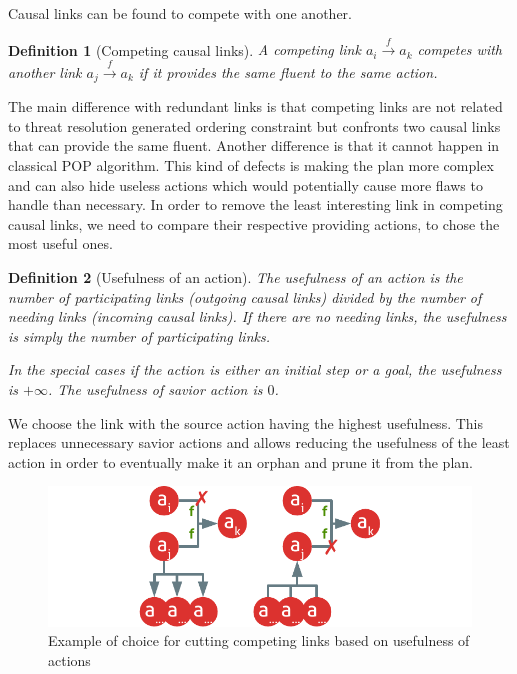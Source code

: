 \documentclass[]{article}
\newtheorem{definition}{Definition}
\begin{document}
Causal links can be found to compete with one another.

\begin{definition}[Competing causal links]

A competing link \(a_i \xrightarrow{f} a_k\) competes with another link
\(a_j \xrightarrow{f} a_k\) if it provides the same fluent to the same
action.

\end{definition}

The main difference with redundant links is that competing links are not
related to threat resolution generated ordering constraint but confronts
two causal links that can provide the same fluent. Another difference is
that it cannot happen in classical POP algorithm. This kind of defects
is making the plan more complex and can also hide useless actions which
would potentially cause more flaws to handle than necessary. In order to
remove the least interesting link in competing causal links, we need to
compare their respective providing actions, to chose the most useful
ones.

\begin{definition}[Usefulness of an action]

The usefulness of an action is the number of participating links
(outgoing causal links) divided by the number of needing links (incoming
causal links). If there are no needing links, the usefulness is simply
the number of participating links.

In the special cases if the action is either an initial step or a goal,
the usefulness is \(+\infty\). The usefulness of savior action is \(0\).

\end{definition}

We choose the link with the source action having the highest usefulness.
This replaces unnecessary savior actions and allows reducing the
usefulness of the least action in order to eventually make it an orphan
and prune it from the plan.

\begin{figure}[htbp]
\centering
\includegraphics{graphics/competing.pdf}
\caption{Example of choice for cutting competing links based on
usefulness of actions\label{fig:competing}}
\end{figure}
\end{document}
